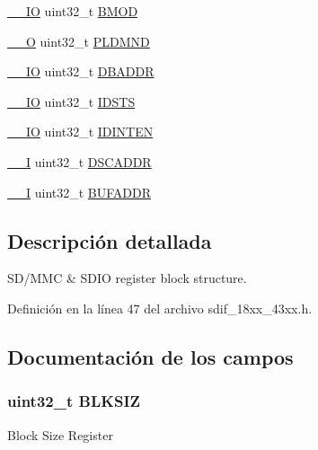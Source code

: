 \begin{DoxyCompactItemize}
\item 
\hyperlink{core__sc300_8h_aec43007d9998a0a0e01faede4133d6be}{\+\_\+\+\_\+\+IO} uint32\+\_\+t \hyperlink{struct_l_p_c___s_d_m_m_c___t_af6e196654c887edf6a502dbf36c01157}{B\+M\+OD}
\item 
\hyperlink{core__sc300_8h_a7e25d9380f9ef903923964322e71f2f6}{\+\_\+\+\_\+O} uint32\+\_\+t \hyperlink{struct_l_p_c___s_d_m_m_c___t_af136fdd14b2c1bc6535894b4a4056312}{P\+L\+D\+M\+ND}
\item 
\hyperlink{core__sc300_8h_aec43007d9998a0a0e01faede4133d6be}{\+\_\+\+\_\+\+IO} uint32\+\_\+t \hyperlink{struct_l_p_c___s_d_m_m_c___t_a5cbf91e6f1065dad3d9bde411008bb9b}{D\+B\+A\+D\+DR}
\item 
\hyperlink{core__sc300_8h_aec43007d9998a0a0e01faede4133d6be}{\+\_\+\+\_\+\+IO} uint32\+\_\+t \hyperlink{struct_l_p_c___s_d_m_m_c___t_af367e34f9e99c0ab70236918d83e8924}{I\+D\+S\+TS}
\item 
\hyperlink{core__sc300_8h_aec43007d9998a0a0e01faede4133d6be}{\+\_\+\+\_\+\+IO} uint32\+\_\+t \hyperlink{struct_l_p_c___s_d_m_m_c___t_a138df0f7066e9b0f1b95cba95dd19d98}{I\+D\+I\+N\+T\+EN}
\item 
\hyperlink{core__sc300_8h_af63697ed9952cc71e1225efe205f6cd3}{\+\_\+\+\_\+I} uint32\+\_\+t \hyperlink{struct_l_p_c___s_d_m_m_c___t_a939100face4afe28dd230579b3b46df4}{D\+S\+C\+A\+D\+DR}
\item 
\hyperlink{core__sc300_8h_af63697ed9952cc71e1225efe205f6cd3}{\+\_\+\+\_\+I} uint32\+\_\+t \hyperlink{struct_l_p_c___s_d_m_m_c___t_a1d7e5707436c3634e5bd9f4b5469cdc1}{B\+U\+F\+A\+D\+DR}
\end{DoxyCompactItemize}


\subsection{Descripción detallada}
S\+D/\+M\+MC \& S\+D\+IO register block structure. 

Definición en la línea 47 del archivo sdif\+\_\+18xx\+\_\+43xx.\+h.



\subsection{Documentación de los campos}
\subsubsection[{\texorpdfstring{B\+L\+K\+S\+IZ}{BLKSIZ}}]{ uint32\+\_\+t B\+L\+K\+S\+IZ}\hypertarget{struct_l_p_c___s_d_m_m_c___t_abe0b30c390d137cd035dd6c0cc52297d}{}\label{struct_l_p_c___s_d_m_m_c___t_abe0b30c390d137cd035dd6c0cc52297d}
Block Size Register 

